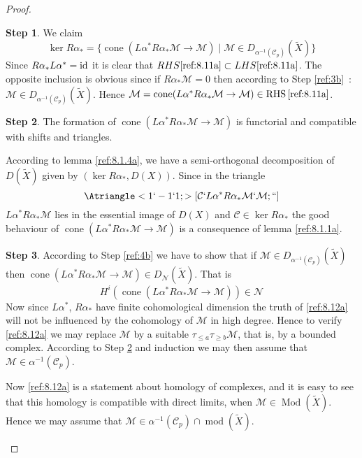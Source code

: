 \documentclass{amsproc}
\def\Cscr{{\mathcal C}}
\def\Mscr{{\mathcal M}}
\def\Nscr{{\mathcal N}}
\DeclareMathOperator{\cone}{cone}
\DeclareMathOperator{\RHS}{RHS}
\def\Id{\text{id}}
\def\ker{\operatorname {ker}}
\def\coh{\operatorname {mod}}
\def\Qch{\operatorname {Mod}}
\def\r{\rightarrow}
\let\oldtext\text
\def\text#1{\oldtext{\upshape #1}}
\theoremstyle{definition}
\newtheorem{step}{Step}
\theoremstyle{remark}
\numberwithin{equation}{section}
\numberwithin{table}{section}
\numberwithin{figure}{section}
\begin{document}
\begin{proof}
\begin{step}
We claim
\begin{equation}
\label{ref:8.11a}
\ker R\alpha_\ast=\{ \cone( L\alpha^\ast R\alpha_\ast\Mscr\r \Mscr
)\mid \Mscr\in D_{\alpha^{-1}(\Cscr_p)}(\tilde{X}) \}
\end{equation}
Since $R\alpha_\ast L\alpha^\ast=\Id$ it is clear that
$RHS\eqref{ref:8.11a}\subset LHS\eqref{ref:8.11a}$.  The opposite inclusion
is obvious since if $R\alpha_\ast\Mscr=0$ then according to Step
\ref{ref:3b}~: $\Mscr\in D_{\alpha^{-1}(\Cscr_p)}(\tilde{X})$. Hence 
$\Mscr=\cone( L\alpha^\ast R\alpha_\ast\Mscr\r\Mscr )\in
\RHS\eqref{ref:8.11a}$.
\end{step}

\begin{step}
\label{ref:5b}
  The formation of $\cone(L\alpha^\ast R\alpha_\ast \Mscr\r\Mscr)$ is
  functorial and compatible with shifts and  triangles.


According to lemma
\ref{ref:8.1.4a}, we have a semi-orthogonal decomposition
of $D(\tilde{X})$ given by $(\ker R\alpha_\ast,D(X))$.
 Since
in the triangle
\[
\Atriangle<1`-1`1; >[\Cscr`L\alpha^\ast R\alpha_\ast\Mscr`\Mscr;``]
\]
$L\alpha^\ast R\alpha_\ast\Mscr$ lies in the essential image  of
$D(X)$ and $\Cscr\in \ker R\alpha_\ast$ the good behaviour of
$\cone(L\alpha^\ast R\alpha_\ast\Mscr\r\Mscr)$ is a consequence of lemma
\ref{ref:8.1.1a}. 
\end{step}

\begin{step}
According to Step \ref{ref:4b} we have to show that if $\Mscr\in
D_{\alpha^{-1}(\Cscr_p)}(\tilde{X})$ then 
$\cone (L\alpha^\ast R\alpha_\ast\Mscr\r\Mscr)\in D_\Nscr(\tilde{X})$. That is
\begin{equation}
\label{ref:8.12a}
H^i(\cone (L\alpha^\ast R\alpha_\ast\Mscr\r\Mscr))\in\Nscr
\end{equation}
Now since $L\alpha^\ast$, $R\alpha_\ast$ have finite cohomological
dimension the truth of \eqref{ref:8.12a} will not be influenced by
the cohomology of $\Mscr$ in high degree. Hence to verify
\eqref{ref:8.12a} we may replace $\Mscr$ by a suitable $\tau_{\le
a}\tau_{\ge b}\Mscr$, that is, by a bounded complex. According to
Step \ref{ref:5b} and induction we may then assume that $\Mscr\in
\alpha^{-1}(\Cscr_p)$. 

Now   \eqref{ref:8.12a} is a statement about homology of complexes, and it is
easy to see that this homology is compatible with direct limits, when
$\Mscr\in\Qch(\tilde{X})$. Hence we may  assume that $\Mscr\in
\alpha^{-1}(\Cscr_p)\cap \coh(\tilde{X})$.


\end{step}
\end{proof}
\end{document}
